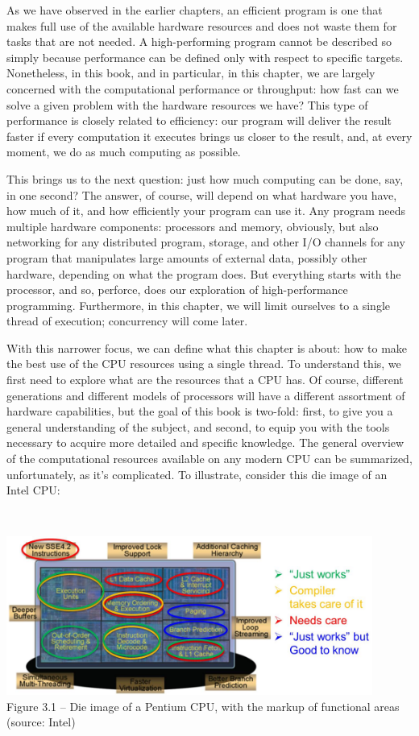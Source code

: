 As we have observed in the earlier chapters, an efficient program is one that makes full use of the available hardware resources and does not waste them for tasks that are not needed. A high-performing program cannot be described so simply because performance can be defined only with respect to specific targets. Nonetheless, in this book, and in particular, in this chapter, we are largely concerned with the computational performance or throughput: how fast can we solve a given problem with the hardware resources we have? This type of performance is closely related to efficiency: our program will deliver the result faster if every computation it executes brings us closer to the result, and, at every moment, we do as much computing as possible.

This brings us to the next question: just how much computing can be done, say, in one second? The answer, of course, will depend on what hardware you have, how much of it, and how efficiently your program can use it. Any program needs multiple hardware components: processors and memory, obviously, but also networking for any distributed program, storage, and other I/O channels for any program that manipulates large amounts of external data, possibly other hardware, depending on what the program does. But everything starts with the processor, and so, perforce, does our exploration of high-performance programming. Furthermore, in this chapter, we will limit ourselves to a single thread of execution; concurrency will come later.

With this narrower focus, we can define what this chapter is about: how to make the best use of the CPU resources using a single thread. To understand this, we first need to explore what are the resources that a CPU has. Of course, different generations and different models of processors will have a different assortment of hardware capabilities, but the goal of this book is two-fold: first, to give you a general understanding of the subject, and second, to equip you with the tools necessary to acquire more detailed and specific knowledge. The general overview of the computational resources available on any modern CPU can be summarized, unfortunately, as it's complicated. To illustrate, consider this die image of an Intel CPU:

\hspace*{\fill} \\ %
\begin{center}
\includegraphics[width=0.9\textwidth]{content/1/chapter3/images/1.jpg}\\
Figure 3.1 – Die image of a Pentium CPU, with the markup of functional areas (source: Intel)
\end{center}


